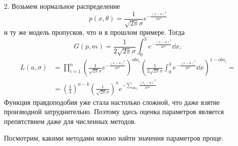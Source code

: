     \vspace{0.2cm}
    2. Возьмем нормальное распределение
    \begin{equation*}
        p(x, \theta) = \frac{1}{\sqrt{2\pi}\sigma}e^{-\frac{(x-a)^2}{2\sigma^2}}
    \end{equation*}
    и ту же модель пропусков, что и в прошлом примере. Тогда
    \begin{equation*}
        G(p, m) = \frac{1}{2\sqrt{2\pi}\sigma}\int_{0}^{3} e^{-\frac{(x-a)^2}{2\sigma^2}} \dd x,
    \end{equation*}
    \begin{align*}
        L(a, \sigma) &= \prod_{i=1}^{n} \left(\frac{1}{\sqrt{2\pi}\sigma}e^{-\frac{(x-a)^2}{2\sigma^2}}\right)^{obs_i} 
        \left(\frac{1}{2\sqrt{2\pi}\sigma}\int_{0}^{3} e^{-\frac{(x-a)^2}{2\sigma^2}} \dd x\right)^{1 - obs_i} = \\ 
                    &= \left(\frac13\right)^{n-k}\left(\frac{1}{\sqrt{2\pi}\sigma}\right)^n e^{-\sum_{obs_i}\frac{(x_i - a)^2}{2\sigma^2}}
    \end{align*}
    Функция правдоподобия уже стала настолько сложной, что даже взятие производной затруднительно. Поэтому здесь оценка параметров является препятствием даже для численных методов.
    
    Посмотрим, какими методами можно найти значения параметров проще.
